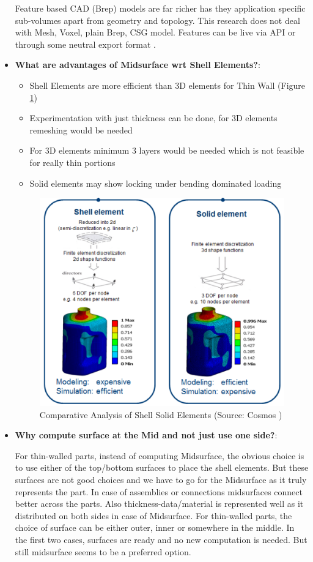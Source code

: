 \begin{itemize}[noitemsep,topsep=2pt,parsep=2pt,partopsep=2pt,leftmargin=*]
Feature based CAD (Brep) models are far richer has they application specific sub-volumes apart from geometry and topology. This research does not deal with Mesh, Voxel, plain Brep, CSG model. Features can be live via API or through some neutral export format  \cite{Dabke1994}.

\item \textbf{What are advantages of Midsurface wrt Shell Elements?}:
	\begin{itemize}[noitemsep,topsep=2pt,parsep=2pt,partopsep=2pt,leftmargin=*]
	\item Shell Elements are more efficient than 3D elements for Thin Wall (Figure \ref{fig:litsurvey:shellsolidelems})
	\item Experimentation with just thickness can be done, for 3D elements remeshing would be needed
	\item For 3D elements minimum 3 layers would be needed which is not feasible for really thin portions
	\item Solid elements may show locking under bending dominated loading
	\end{itemize}
		

	\begin{figure} [!h]
		\centering
		\includegraphics[width=0.6\linewidth]{..//Common/images/ShellSolidElems}
		\caption{Comparative Analysis of Shell Solid Elements (Source: Cosmos \cite{Cosmos2006})}
		\label{fig:litsurvey:shellsolidelems}
	\end{figure}
	


	
\item \textbf{Why compute surface at the Mid and not just use one side?}: 

For thin-walled parts, instead of computing Midsurface, the obvious choice is to use either of the top/bottom surfaces to place the shell elements. But these surfaces are not good choices and we have to go for the Midsurface as it truly represents the part. In case of assemblies or connections midsurfaces connect better across the parts. Also thickness-data/material is represented well as it distributed on both sides in case of Midsurface. For thin-walled parts, the choice of surface can be either outer, inner or somewhere in the middle. In the first two cases, surfaces are ready and no new computation is needed. But still midsurface seems to be a preferred option. 


\end{itemize}
